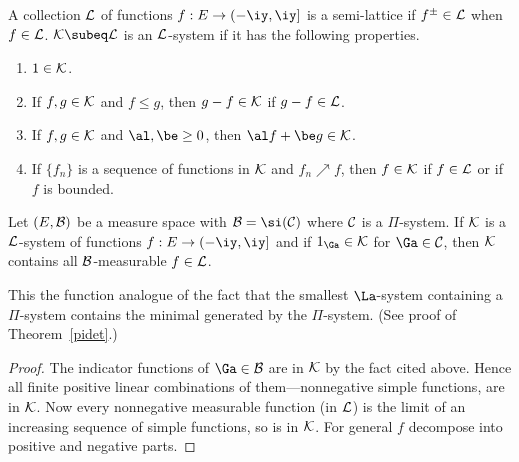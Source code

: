 \begin{df}
A collection $\cal L$ of functions $f:E\to (-\iy,\iy]$ is a semi-lattice if $f^{\pm}\in \cal L$ when $f\in \cal L$. $\cal K\subeq \cal L$ is an $\cal L$-system if it has the following properties.
\begin{enumerate}
\item $1\in \cal K$.
\item If $f,g\in \cal K$ and $f\le g$, then $g-f\in \cal K$ if $g-f\in \cal L$.
\item If $f,g\in \cal K$ and $\al,\be\ge 0$, then $\al f+\be g\in \cal K$.
\item If $\{f_n\}$ is a sequence of functions in $\cal K$ and $f_n\nearrow f$, then $f\in \cal K$ if $f\in \cal L$ or if $f$ is bounded.
\end{enumerate}
\end{df}
\begin{lem}\label{lsys}
Let $(E,\cal B)$ be a measure space with $\cal B=\si(\cal C)$ where $\cal C$ is a $\Pi$-system. If $\cal K$ is a $\cal L$-system of functions $f:E\to (-\iy,\iy]$ and if $1_{\Ga}\in \cal K$ for $\Ga\in \cal C$, then $\cal K$ contains all $\cal B$-measurable $f\in \cal L$.
\end{lem}
This the function analogue of the fact that the smallest $\La$-system containing a $\Pi$-system contains the minimal \sia{} generated by the $\Pi$-system. (See proof of Theorem~\ref{pidet}.)
\begin{proof}
The indicator functions of $\Ga\in \cal B$ are in $\cal K$ by the fact cited above. Hence all finite positive linear combinations of them---nonnegative simple functions, are in $\cal K$. Now every nonnegative measurable function (in $\cal L$) is the limit of an increasing sequence of simple functions, so is in $\cal K$. For general $f$ decompose into positive and negative parts. 
\end{proof}


